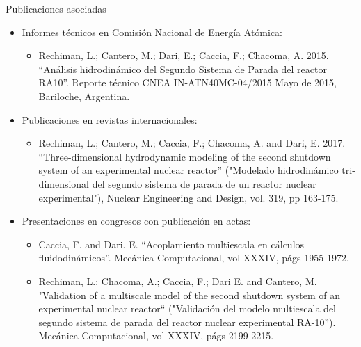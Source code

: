 \documentclass[12pt,screen,twoside,pagebackref]{ibtesis}
\begin{document}

\appendix




\begin{biblio}

\end{biblio}


\begin{postliminary}

\begin{seccion}{Publicaciones asociadas}
\begin{itemize}

\item Informes técnicos en Comisión Nacional de Energía Atómica:
\begin{itemize}
\item Rechiman, L.; Cantero, M.; Dari, E.; Caccia, F.; Chacoma, A. 2015. “Análisis hidrodinámico del Segundo Sistema de Parada del reactor RA10”. Reporte técnico CNEA IN-ATN40MC-04/2015 Mayo de 2015, Bariloche, Argentina.
\end{itemize}

\item Publicaciones en revistas internacionales:
\begin{itemize}
\item Rechiman, L.; Cantero, M.; Caccia, F.; Chacoma, A. and Dari, E. 2017. “Three-dimensional hydrodynamic modeling of the second shutdown system of an experimental nuclear reactor” ("Modelado hidrodinámico tri-dimensional del segundo sistema de parada de un reactor nuclear experimental"), Nuclear Engineering and Design, vol. 319, pp 163-175.
\end{itemize}

\item Presentaciones en congresos con publicación en actas:
\begin{itemize}
\item Caccia, F. and Dari. E. “Acoplamiento multiescala en cálculos fluidodinámicos”. Mecánica Computacional, vol XXXIV, págs 1955-1972.

\item Rechiman, L.; Chacoma, A.; Caccia, F.; Dari E. and Cantero, M. "Validation of a multiscale model of the second shutdown system of an experimental nuclear reactor“ ("Validación del modelo multiescala del segundo sistema de parada del reactor nuclear experimental RA-10”). Mecánica Computacional, vol XXXIV, págs 2199-2215.
\end{itemize}


\end{itemize}
\end{seccion}
\end{postliminary}
\end{document}
